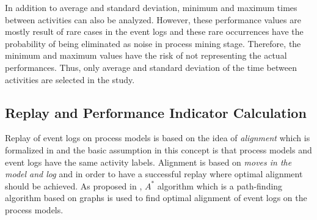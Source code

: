 In addition to average and standard deviation, minimum and maximum times between activities can also be analyzed. However, these performance values are mostly result of rare cases in the event logs and these rare occurrences have the probability of being eliminated as noise in process mining stage. Therefore, the minimum and maximum values have the risk of not representing the actual performances. Thus, only average and standard deviation of the time between activities are selected in the study. 

\subsection{Replay and Performance Indicator Calculation}
\label{subsec:replay-and-performance-summary}
Replay of event logs on process models is based on the idea of \textit{alignment} which is formalized in \cite{van2012replaying} and the basic assumption in this concept is that process models and event logs have the same activity labels. Alignment is based on \textit{moves in the model and log} and in order to have a successful replay where optimal alignment should be achieved. As proposed in \cite{adriansyah2011conformance} \cite{adriansyah2011towards}, $A^{*}$ algorithm which is a path-finding algorithm based on graphs is used to find optimal alignment of event logs on the process models.

